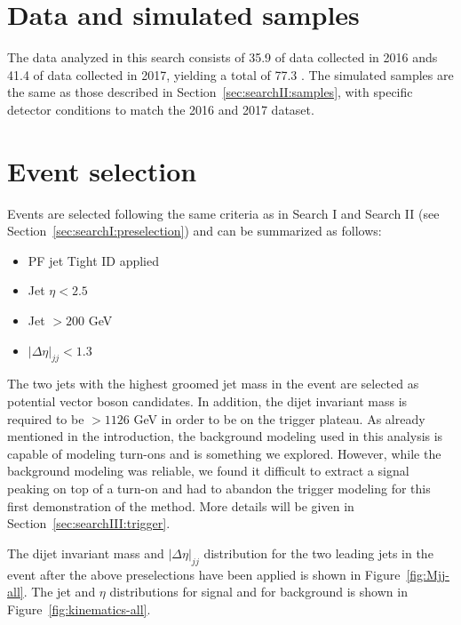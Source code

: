 \section{Data and simulated samples}
The data analyzed in this search consists of 35.9 \fbinv of data collected in 2016 ands 41.4 \fbinv of data collected in 2017, yielding a total of 77.3 \fbinv.\newline
The simulated samples are the same as those described in Section~\ref{sec:searchII:samples}, with specific detector conditions to match the 2016 and 2017 dataset.

\section{Event selection}
Events are selected following the same criteria as in Search I and Search II (see Section~\ref{sec:searchI:preselection}) and can be summarized as follows:
\begin{itemize}
    \itemsep0em 
\item PF jet Tight ID applied
\item Jet $\eta < 2.5$
\item Jet \pt $> 200$ GeV
\item $|\Delta\eta|_{jj} < 1.3$
\end{itemize} 
The two jets with the highest groomed jet mass in the event are selected as potential vector boson candidates. In addition, the dijet invariant mass is required to be $> 1126$ GeV in order to be on the trigger plateau.
As already mentioned in the introduction, the background modeling used in this analysis is capable of modeling turn-ons and is something we explored. However, while the background modeling was reliable, we found it difficult to extract a signal peaking on top of a turn-on and had to abandon the trigger modeling for this first demonstration of the method. More details will be given in Section~\ref{sec:searchIII:trigger}.\newline 

The dijet invariant mass and $|\Delta\eta|_{jj}$ distribution for the two leading jets in the event after the above preselections have been applied is shown in Figure~\ref{fig:Mjj-all}. The jet \PT{} and $\eta$ distributions for signal and for background is shown in Figure~\ref{fig:kinematics-all}. 

